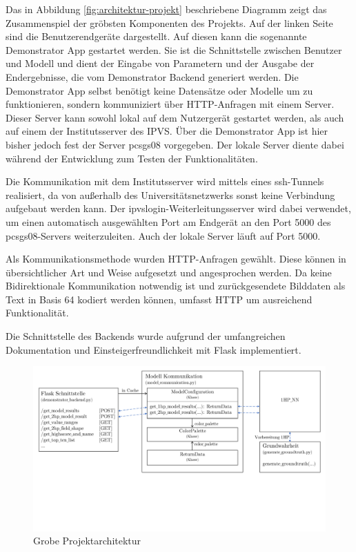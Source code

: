 \documentclass[a4paper]{extarticle}
\begin{document}
    Das in Abbildung \ref{fig:architektur-projekt} beschriebene Diagramm zeigt das Zusammenspiel der gröbsten Komponenten des Projekts.
    Auf der linken Seite sind die Benutzerendgeräte dargestellt. 
    Auf diesen kann die sogenannte Demonstrator App gestartet werden.
    Sie ist die Schnittstelle zwischen Benutzer und Modell und dient der Eingabe von Parametern und der Ausgabe der Endergebnisse, 
    die vom Demonstrator Backend generiert werden.
    Die Demonstrator App selbst benötigt keine Datensätze oder Modelle um zu funktionieren, sondern kommuniziert über HTTP-Anfragen mit einem Server.
    Dieser Server kann sowohl lokal auf dem Nutzergerät gestartet werden, als auch auf einem der Institutsserver des IPVS.
    Über die Demonstrator App ist hier bisher jedoch fest der Server \glqq{}pcsgs08\grqq{} vorgegeben.
    Der lokale Server diente dabei während der Entwicklung zum Testen der Funktionalitäten. 

    Die Kommunikation mit dem Institutsserver wird mittels eines ssh-Tunnels realisiert, 
    da von außerhalb des Universitätsnetzwerks sonst keine Verbindung aufgebaut werden kann.
    Der ipvslogin-Weiterleitungsserver wird dabei verwendet, 
    um einen automatisch ausgewählten Port am Endgerät an den Port 5000 des pcsgs08-Servers weiterzuleiten.
    Auch der lokale Server läuft auf Port 5000.

    Als Kommunikationsmethode wurden HTTP-Anfragen gewählt. 
    Diese können in übersichtlicher Art und Weise aufgesetzt und angesprochen werden.
    Da keine Bidirektionale Kommunikation notwendig ist und zurückgesendete Bilddaten als Text in Basis 64 kodiert werden können,
    umfasst HTTP um ausreichend Funktionalität.

    Die Schnittstelle des Backends wurde aufgrund der umfangreichen Dokumentation und Einsteigerfreundlichkeit mit Flask implementiert.

    \begin{figure}[H]
        \centering
        \includegraphics[trim={0cm 6cm 0cm 0}, clip, width=\linewidth]{bilder/architektur_backend.pdf}
        \caption{Grobe Projektarchitektur} \label{fig:architektur-backend}
    \end{figure}
\end{document}
